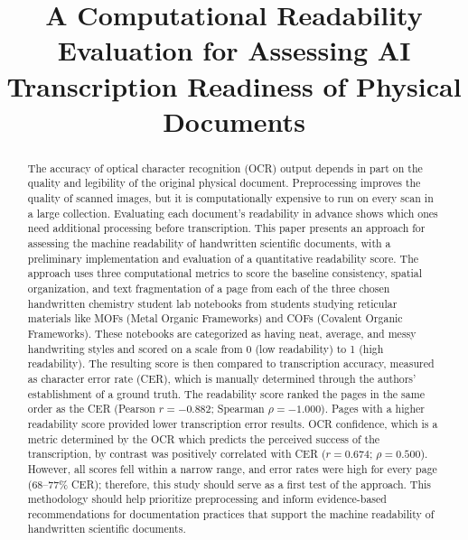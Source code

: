 \documentclass[conference]{IEEEtran}
\begin{document}
\title{A Computational Readability Evaluation for Assessing AI Transcription
Readiness of Physical Documents}

\author{
\and
{}
\and
{}
}

\maketitle

\begin{abstract}
The accuracy of optical character recognition (OCR) output depends in part on
the quality and legibility of the original physical document. Preprocessing
improves the quality of scanned images, but it is computationally expensive to
run on every scan in a large collection. Evaluating each document's readability
in advance shows which ones need additional processing before transcription.
This paper presents an approach for assessing the machine readability of
handwritten scientific documents, with a preliminary implementation and
evaluation of a quantitative readability score. The approach uses three
computational metrics to score the baseline consistency, spatial organization,
and text fragmentation of a page from each of the three chosen handwritten
chemistry student lab notebooks from students studying reticular materials like MOFs (Metal Organic
Frameworks) and COFs (Covalent Organic Frameworks). These notebooks are categorized as having neat, average, and messy
handwriting styles and scored on a scale from 0 (low readability) to 1 (high
readability). The resulting score is then compared to transcription accuracy,
measured as character error rate (CER), which is manually determined through
the authors' establishment of a ground truth. The readability score ranked the
pages in the same order as the CER (Pearson $r = -0.882$; Spearman
$\rho = -1.000$). Pages with a higher readability score provided lower
transcription error results. OCR confidence, which is a metric determined by
the OCR which predicts the perceived success of the transcription, by contrast
was positively correlated with CER ($r = 0.674$; $\rho = 0.500$). However, all
scores fell within a narrow range, and error rates were high for every page
(68--77\% CER); therefore, this study should serve as a first test of the
approach. This methodology should help prioritize preprocessing and inform
evidence-based recommendations for documentation practices that support the
machine readability of handwritten scientific documents.
\end{abstract}
\end{document}
